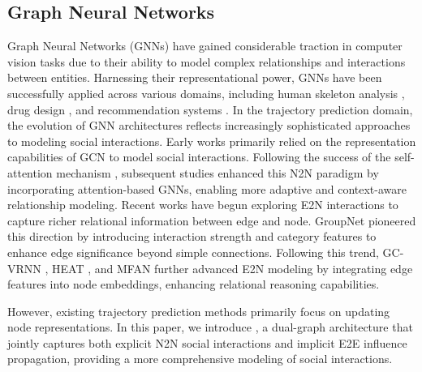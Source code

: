 \subsection{Graph Neural Networks}
Graph Neural Networks (GNNs) have gained considerable traction in computer vision tasks due to their ability to model complex relationships and interactions between entities. Harnessing their representational power, GNNs have been successfully applied across various domains, including human skeleton analysis \cite{qiao20222ggcn, yan2018spatial, liu2023skeletonrecognition}, drug design \cite{li2022graphdrug2}, and recommendation systems \cite{wang2019rs1}. In the trajectory prediction domain, the evolution of GNN architectures reflects increasingly sophisticated approaches to modeling social interactions. Early works \cite{Mohamed2020socialstgcnn, yu2018spatiotraffic} primarily relied on the representation capabilities of GCN to model social interactions. Following the success of the self-attention mechanism \cite{vaswani2017transformer}, subsequent studies \cite{kosaraju2019socialbigat, huang2019stgat, shi2021sgcn, ruochen2022multiclassSGCN, shi2023TUTR} enhanced this N2N paradigm by incorporating attention-based GNNs, enabling more adaptive and context-aware relationship modeling. Recent works have begun exploring E2N interactions to capture richer relational information between edge and node. GroupNet \cite{Xu2022GroupNetMH} pioneered this direction by introducing interaction strength and category features to enhance edge significance beyond simple connections. Following this trend, GC-VRNN \cite{xu2023gcvrnn}, HEAT \cite{mo2021edge_mask}, and MFAN \cite{li2024mfan} further advanced E2N modeling by integrating edge features into node embeddings, enhancing relational reasoning capabilities. 

However, existing trajectory prediction methods primarily focus on updating node representations. In this paper, we introduce \modulename, a dual-graph architecture that jointly captures both explicit N2N social interactions and implicit E2E influence propagation, providing a more comprehensive modeling of social interactions.


